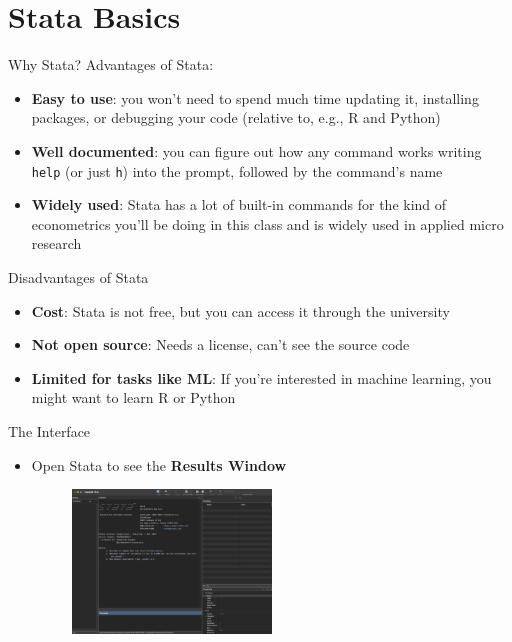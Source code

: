 \documentclass[11pt,notes=hide,aspectratio=169,mathserif]{beamer}
\begin{document}
\section{Stata Basics}
\begin{frame}{Why Stata?}
Advantages of Stata: 
    \begin{itemize}
        \item \textbf{Easy to use}: you won't need to spend much time updating it, installing packages, or debugging your code (relative to, e.g., R and Python) 
        \item \textbf{Well documented}: you can figure out how any command works writing \texttt{help} (or just \texttt{h}) into the prompt, followed by the command's name
        \item \textbf{Widely used}: Stata has a lot of built-in commands for the kind of econometrics you'll be doing in this class and is widely used in applied micro research
    \end{itemize}
\end{frame}

\begin{frame}{Disadvantages of Stata}
\begin{itemize}
    \item \textbf{Cost}: Stata is not free, but you can access it through the university
    \item \textbf{Not open source}: Needs a license, can't see the source code 
    \item \textbf{Limited for tasks like ML}: If you're interested in machine learning, you might want to learn R or Python
\end{itemize}
\end{frame}

\begin{frame}{The Interface}
    \begin{itemize}
    \item Open Stata to see the \textbf{Results Window}
        \begin{figure}
            \centering
            \includegraphics[width=0.5\textwidth]{inputs/ta1_result_window1.png}
        \end{figure}
    \end{itemize}
\end{frame}
\end{document}

